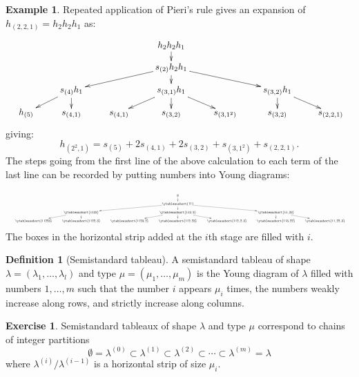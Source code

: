 \documentclass[11pt]{amsproc}
\theoremstyle{definition}
\newtheorem{definition}[theorem]{Definition}
\theoremstyle{example}
\newtheorem{example}[theorem]{Example}
\newtheorem{exercise}[theorem]{Exercise}
\begin{document}
\begin{example}
  \label{example:expansion-h}
  Repeated application of Pieri's rule gives an expansion of $h_{(2, 2, 1)} = h_2h_2h_1$ as:
  \begin{displaymath}
    \resizebox{\textwidth}{!}{
      \xymatrix@R-15pt{
        &&&h_2 h_2 h_1\ar[d]&&&\\
        &&&s_{(2)} h_2 h_1\ar[dll]\ar[d]\ar[drr]&&\\
        &s_{(4)}h_1\ar[dl]\ar[d] && s_{(3,1)}h_1\ar[dl]\ar[d]\ar[dr] && s_{(3,2)}h_1 \ar[d]\ar[dr]&\\
        h_{(5)} & s_{(4, 1)} & s_{(4,1)} & s_{(3, 2)} & s_{(3, 1^2)} & s_{(3,2)} & s_{(2,2,1)}
      }
    }
  \end{displaymath}
  giving:
  \begin{displaymath}
    h_{(2^2,1)} = s_{(5)} + 2s_{(4,1)} + 2s_{(3,2)} + s_{(3,1^2)} + s_{(2,2,1)}.
  \end{displaymath}
  The steps going from the first line of the above calculation to each term of the last line can be recorded by putting numbers into Young diagrams:
  \begin{displaymath}
    \resizebox{\textwidth}{!}{
      \xymatrix@R-15pt{
        &&&\emptyset\ar[d]&&&\\
        &&&\ytableaushort{11}\ar[dll]\ar[d]\ar[drr]&&\\
        &\ytableaushort{1122}\ar[dl]\ar[d] && \ytableaushort{112,2}\ar[dl]\ar[d]\ar[dr] && \ytableaushort{11,22}\ar[d]\ar[dr]&\\
        \ytableaushort{11223} & \ytableaushort{1122,3} & \ytableaushort{1123,2} & \ytableaushort{112,23} & \ytableaushort{112,2,3} & \ytableaushort{113,22} & \ytableaushort{11,22,3}
      }
    }
  \end{displaymath}
  The boxes in the horizontal strip added at the $i$th stage are filled with $i$.
\end{example}
\begin{definition}
  [Semistandard tableau]
  A semistandard tableau of shape $\lambda=(\lambda_1,\dotsc,\lambda_l)$ and type $\mu=(\mu_1,\dotsc,\mu_m)$ is the Young diagram of $\lambda$ filled with numbers $1,\dotsc, m$ such that the number $i$ appears $\mu_i$ times, the numbers weakly increase along rows, and strictly increase along columns.
\end{definition}
\begin{exercise}
  Semistandard tableaux of shape $\lambda$ and type $\mu$ correspond to chains of integer partitions
  \begin{displaymath}
    \emptyset = \lambda^{(0)} \subset \lambda^{(1)}\subset \lambda^{(2)} \subset \dotsb \subset \lambda^{(m)} = \lambda
  \end{displaymath}
  where $\lambda^{(i)}/\lambda^{(i-1)}$ is a horizontal strip of size $\mu_i$.
\end{exercise}
\end{document}
